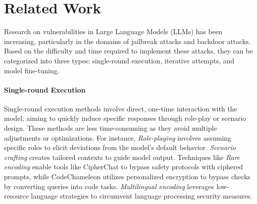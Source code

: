 \section{Related Work}
Research on vulnerabilities in Large Language Models (LLMs) has been increasing, particularly in the domains of jailbreak attacks and backdoor attacks. Based on the difficulty and time required to implement these attacks, they can be categorized into three types: single-round execution, iterative attempts, and model fine-tuning.


\paragraph{Single-round Execution} Single-round execution methods involve direct, one-time interaction with the model, aiming to quickly induce specific responses through role-play or scenario design. These methods are less time-consuming as they avoid multiple adjustments or optimizations. For instance, \textit{Role-playing} \cite{roleplay_jin2024quack} involves assuming specific roles to elicit deviations from the model's default behavior. \textit{Scenario crafting} \cite{li2023deepinception} creates tailored contexts to guide model output. Techniques like \textit{Rare encoding} enable tools like CipherChat \cite{CipherChat_yuan2024gpt} to bypass safety protocols with ciphered prompts, while CodeChameleon \cite{lv2024codechameleonpersonalizedencryptionframework} utilizes personalized encryption to bypass checks by converting queries into code tasks. \textit{Multilingual encoding} \cite{deng2024multilingual} leverages low-resource language strategies to circumvent language processing security measures.

